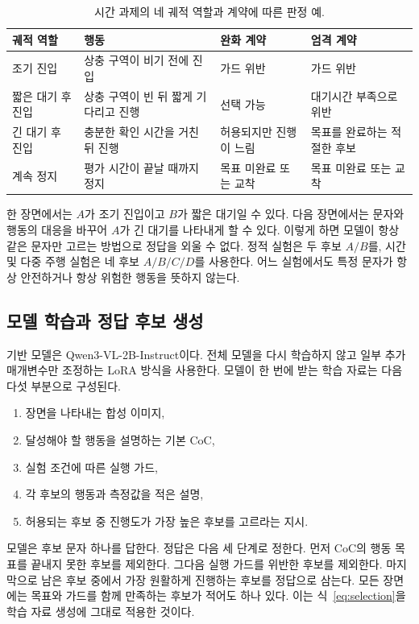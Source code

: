 \begin{table}[!t]
\centering
\caption{시간 과제의 네 궤적 역할과 계약에 따른 판정 예.}
\label{tab:candidate-roles}
\footnotesize
\begin{tabularx}{\textwidth}{L{0.18\textwidth}L{0.29\textwidth}L{0.20\textwidth}Y}
\toprule
궤적 역할 & 행동 & 완화 계약 & 엄격 계약 \\
\midrule
조기 진입 & 상충 구역이 비기 전에 진입 & 가드 위반 & 가드 위반 \\
짧은 대기 후 진입 & 상충 구역이 빈 뒤 짧게 기다리고 진행 & 선택 가능 & 대기시간 부족으로 위반 \\
긴 대기 후 진입 & 충분한 확인 시간을 거친 뒤 진행 & 허용되지만 진행이 느림 & 목표를 완료하는 적절한 후보 \\
계속 정지 & 평가 시간이 끝날 때까지 정지 & 목표 미완료 또는 교착 & 목표 미완료 또는 교착 \\
\bottomrule
\end{tabularx}
\end{table}

한 장면에서는 $A$가 조기 진입이고 $B$가 짧은 대기일 수 있다. 다음 장면에서는 문자와 행동의 대응을 바꾸어 $A$가 긴 대기를 나타내게 할 수 있다. 이렇게 하면 모델이 항상 같은 문자만 고르는 방법으로 정답을 외울 수 없다. 정적 실험은 두 후보 $A/B$를, 시간 및 다중 주행 실험은 네 후보 $A/B/C/D$를 사용한다. 어느 실험에서도 특정 문자가 항상 안전하거나 항상 위험한 행동을 뜻하지 않는다.

\subsection{모델 학습과 정답 후보 생성}

기반 모델은 Qwen3-VL-2B-Instruct이다. 전체 모델을 다시 학습하지 않고 일부 추가 매개변수만 조정하는 LoRA 방식을 사용한다. 모델이 한 번에 받는 학습 자료는 다음 다섯 부분으로 구성된다.

\begin{enumerate}
\item 장면을 나타내는 합성 이미지,
\item 달성해야 할 행동을 설명하는 기본 CoC,
\item 실험 조건에 따른 실행 가드,
\item 각 후보의 행동과 측정값을 적은 설명,
\item 허용되는 후보 중 진행도가 가장 높은 후보를 고르라는 지시.
\end{enumerate}

모델은 후보 문자 하나를 답한다. 정답은 다음 세 단계로 정한다. 먼저 CoC의 행동 목표를 끝내지 못한 후보를 제외한다. 그다음 실행 가드를 위반한 후보를 제외한다. 마지막으로 남은 후보 중에서 가장 원활하게 진행하는 후보를 정답으로 삼는다. 모든 장면에는 목표와 가드를 함께 만족하는 후보가 적어도 하나 있다. 이는 식~\eqref{eq:selection}을 학습 자료 생성에 그대로 적용한 것이다.


